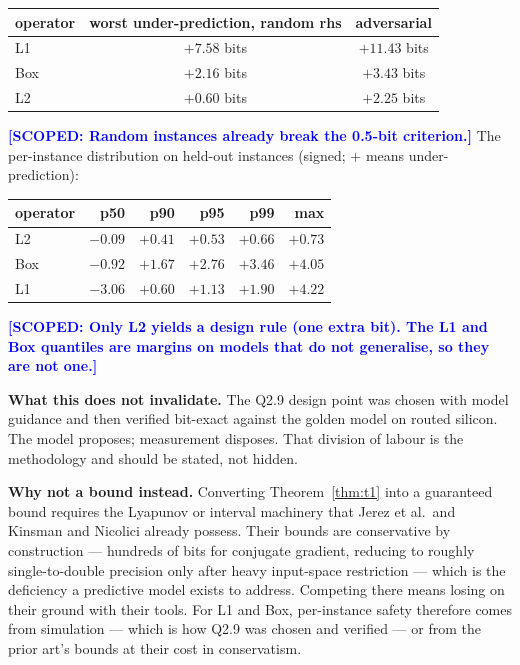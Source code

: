 \documentclass[11pt,a4paper]{article}
\newcommand{\scoped}[1]{\textcolor{blue}{\textbf{[SCOPED: #1]}}}
\begin{document}
\begin{table}[h]\centering
\begin{tabular}{lcc}
\toprule
operator & worst under-prediction, random rhs & adversarial \\
\midrule
L1  & $+7.58$ bits & $+11.43$ bits \\
Box & $+2.16$ bits & $+3.43$ bits \\
L2  & $+0.60$ bits & $+2.25$ bits \\
\bottomrule
\end{tabular}
\end{table}

\scoped{Random instances already break the 0.5-bit criterion.} The per-instance
distribution on held-out instances (signed; $+$ means under-prediction):

\begin{center}\small
\begin{tabular}{lrrrrr}
\toprule
operator & p50 & p90 & p95 & p99 & max \\
\midrule
L2  & $-0.09$ & $+0.41$ & $+0.53$ & $+0.66$ & $+0.73$ \\
Box & $-0.92$ & $+1.67$ & $+2.76$ & $+3.46$ & $+4.05$ \\
L1  & $-3.06$ & $+0.60$ & $+1.13$ & $+1.90$ & $+4.22$ \\
\bottomrule
\end{tabular}
\end{center}
\scoped{Only L2 yields a design rule (one extra bit). The L1 and Box quantiles
are margins on models that do not generalise, so they are not one.}

\textbf{What this does not invalidate.} The Q2.9 design point was chosen with
model guidance and then verified bit-exact against the golden model on routed
silicon. The model proposes; measurement disposes. That division of labour is
the methodology and should be stated, not hidden.

\textbf{Why not a bound instead.} Converting Theorem~\ref{thm:t1} into a
guaranteed bound requires the Lyapunov or interval machinery that Jerez et al.\
and Kinsman and Nicolici already possess. Their bounds are conservative by
construction --- hundreds of bits for conjugate gradient, reducing to roughly
single-to-double precision only after heavy input-space restriction --- which
is the deficiency a predictive model exists to address. Competing there means
losing on their ground with their tools. For L1 and Box, per-instance safety therefore comes from
simulation --- which is how Q2.9 was chosen and verified --- or from the prior
art's bounds at their cost in conservatism.
\end{document}
